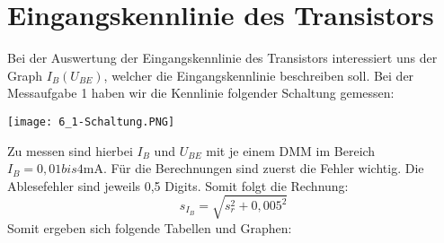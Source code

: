 

\section{Eingangskennlinie des Transistors}
Bei der Auswertung der Eingangskennlinie des Transistors interessiert uns der Graph $I_B(U_{BE})$, welcher die Eingangskennlinie beschreiben soll. Bei der Messaufgabe 1 haben wir die Kennlinie folgender Schaltung gemessen:
\begin{center}
    \texttt{[image: 6\_1-Schaltung.PNG]}
\end{center}
Zu messen sind hierbei $I_B$ und $U_{BE}$ mit je einem DMM im Bereich $I_B=0,01 bis 4 \text{mA}$. Für die Berechnungen sind zuerst die Fehler wichtig. Die Ablesefehler sind jeweils 0,5 Digits. Somit folgt die Rechnung:
\begin{equation}
    s_{I_B}=\sqrt{s_r^2+0,005^2}
\end{equation}
\newpage
Somit ergeben sich folgende Tabellen und Graphen:
